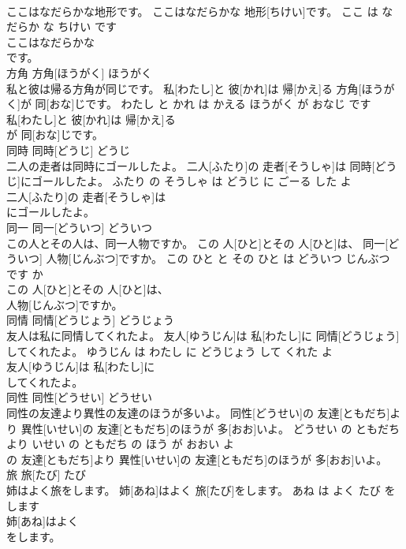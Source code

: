 \documentclass[8pt]{extreport}
\begin{document}
\begin{CJK}{UTF8}{min}
\\	ここはなだらかな地形です。	ここはなだらかな 地形[ちけい]です。	ここ は なだらか な ちけい です	
\\	ここはなだらかな
\\	です。			
\\	方角	方角[ほうがく]	ほうがく	
\\	私と彼は帰る方角が同じです。	私[わたし]と 彼[かれ]は 帰[かえ]る 方角[ほうがく]が 同[おな]じです。	わたし と かれ は かえる ほうがく が おなじ です	
\\	私[わたし]と 彼[かれ]は 帰[かえ]る
\\	が 同[おな]じです。			
\\	同時	同時[どうじ]	どうじ	
\\	二人の走者は同時にゴールしたよ。	二人[ふたり]の 走者[そうしゃ]は 同時[どうじ]にゴールしたよ。	ふたり の そうしゃ は どうじ に ごーる した よ	
\\	二人[ふたり]の 走者[そうしゃ]は
\\	にゴールしたよ。			
\\	同一	同一[どういつ]	どういつ	
\\	この人とその人は、同一人物ですか。	この 人[ひと]とその 人[ひと]は、 同一[どういつ] 人物[じんぶつ]ですか。	この ひと と その ひと は どういつ じんぶつ です か	
\\	この 人[ひと]とその 人[ひと]は、
\\	人物[じんぶつ]ですか。			
\\	同情	同情[どうじょう]	どうじょう	
\\	友人は私に同情してくれたよ。	友人[ゆうじん]は 私[わたし]に 同情[どうじょう]してくれたよ。	ゆうじん は わたし に どうじょう して くれた よ	
\\	友人[ゆうじん]は 私[わたし]に
\\	してくれたよ。			
\\	同性	同性[どうせい]	どうせい	
\\	同性の友達より異性の友達のほうが多いよ。	同性[どうせい]の 友達[ともだち]より 異性[いせい]の 友達[ともだち]のほうが 多[おお]いよ。	どうせい の ともだち より いせい の ともだち の ほう が おおい よ	
\\	の 友達[ともだち]より 異性[いせい]の 友達[ともだち]のほうが 多[おお]いよ。			
\\	旅	旅[たび]	たび	
\\	姉はよく旅をします。	姉[あね]はよく 旅[たび]をします。	あね は よく たび を します	
\\	姉[あね]はよく
\\	をします。			

\end{CJK}
\end{document}

